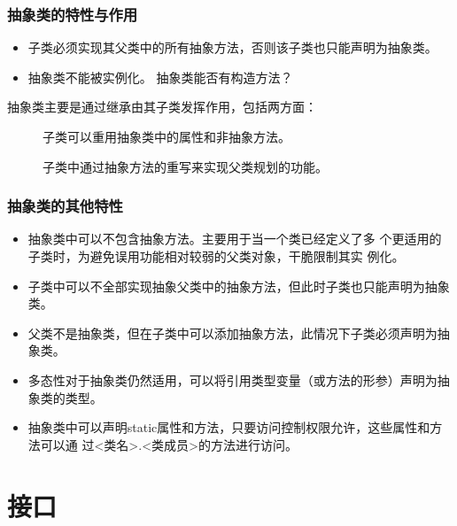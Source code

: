 \begin{frame}[fragile] %
  \frametitle{抽象类的特性与作用}


  \begin{itemize}[<+-| alert@+>]
  \item 子类必须实现其父类中的所有抽象方法，否则该子类也只能声明为抽象类。
  \item 抽象类不能被实例化。\pause{} 抽象类能否有构造方法？
  \end{itemize}
  
  \pause
  
  
  抽象类主要是通过继承由其子类发挥作用，包括两方面：
  
  \begin{description}
  \item[] 子类可以重用抽象类中的属性和非抽象方法。
  \item[] 子类中通过抽象方法的重写来实现父类规划的功能。
  \end{description}
\end{frame}


\begin{frame}[fragile] %
  \frametitle{抽象类的其他特性}
  
  \begin{itemize}[<+-| alert@+>]
  \item 抽象类中可以不包含抽象方法。{\kai 主要用于当一个类已经定义了多
      个更适用的子类时，为避免误用功能相对较弱的父类对象，干脆限制其实
      例化。}
  \item 子类中可以不全部实现抽象父类中的抽象方法，但此时子类也只能声明为抽象类。
  \item 父类不是抽象类，但在子类中可以添加抽象方法，此情况下子类必须声明为抽象类。
  \item 多态性对于抽象类仍然适用，可以将引用类型变量（或方法的形参）声明为抽象类的类型。
  \item 抽象类中可以声明static属性和方法，只要访问控制权限允许，这些属性和方法可以通
    过{\kai <类名>.<类成员>}的方法进行访问。
  \end{itemize}
\end{frame}

\section{接口}

